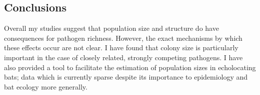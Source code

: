 \subsection{Conclusions}


Overall my studies suggest that population size and structure do have consequences for pathogen richness. 
However, the exact mechanisms by which these effects occur are not clear.
I have found that colony size is particularly important in the case of closely related, strongly competing pathogens.
I have also provided a tool to facilitate the estimation of population sizes in echolocating bats; data which is currently sparse despite its importance to epidemiology and bat ecology more generally.



